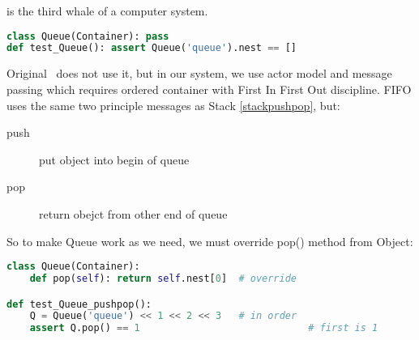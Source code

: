 \clearpage{}

 is the third whale of a computer system.

\begin{lstlisting}[language=Python]
class Queue(Container): pass
def test_Queue(): assert Queue('queue').nest == []
\end{lstlisting}

\noindent
Original \F\ does not use it, but in our system, we use actor model and message
passing which requires ordered container with First In First Out discipline.
FIFO uses the same two principle messages as Stack \ref{stackpushpop}, but:
\begin{description}
\item[push] put object into begin of queue
\item[pop] return obejct from other end of queue
\end{description}

\clearpage
So to make Queue work as we need, we must override pop() method from Object:
\begin{lstlisting}[language=Python]
class Queue(Container):
	def pop(self): return self.nest[0]	# override

def test_Queue_pushpop():
	Q = Queue('queue') << 1 << 2 << 3	# in order
	assert Q.pop() == 1								# first is 1
\end{lstlisting}
    